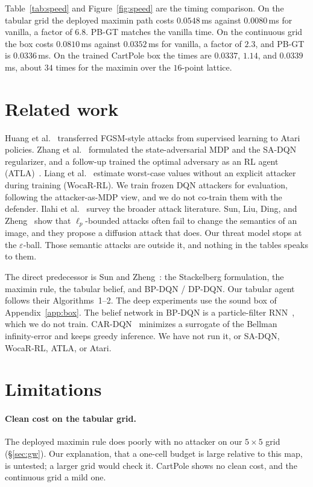 \documentclass[10pt,twocolumn]{article}
\begin{document}
Table~\ref{tab:speed} and Figure~\ref{fig:speed} are the timing comparison.
On the tabular grid the deployed maximin path costs $0.0548$\,ms against $0.0080$\,ms for vanilla, a factor of $6.8$.
PB-GT matches the vanilla time.
On the continuous grid the box costs $0.0810$\,ms against $0.0352$\,ms for vanilla, a factor of $2.3$, and PB-GT is $0.0336$\,ms.
On the trained CartPole box the times are $0.0337$, $1.14$, and $0.0339$\,ms, about $34$ times for the maximin over the $16$-point lattice.

\section{Related work}
\label{sec:related}

Huang et al.~\cite{huang2017adversarial} transferred FGSM-style attacks from supervised learning to Atari policies.
Zhang et al.~\cite{zhang2020robust} formulated the state-adversarial MDP and the SA-DQN regularizer, and a follow-up trained the optimal adversary as an RL agent (ATLA)~\cite{zhang2021robust}.
Liang et al.~\cite{liang2022wocar} estimate worst-case values without an explicit attacker during training (WocaR-RL).
We train frozen DQN attackers for evaluation, following the attacker-as-MDP view, and we do not co-train them with the defender.
Ilahi et al.~\cite{ilahi2022challenges} survey the broader attack literature.
Sun, Liu, Ding, and Zheng~\cite{sun2025shift} show that $\ell_p$-bounded attacks often fail to change the semantics of an image, and they propose a diffusion attack that does.
Our threat model stops at the $\varepsilon$-ball.
Those semantic attacks are outside it, and nothing in the tables speaks to them.

The direct predecessor is Sun and Zheng~\cite{sun2024belief}: the Stackelberg formulation, the maximin rule, the tabular belief, and BP-DQN / DP-DQN.
Our tabular agent follows their Algorithms~1--2.
The deep experiments use the sound box of Appendix~\ref{app:box}.
The belief network in BP-DQN is a particle-filter RNN~\cite{ma2020pfrnn}, which we do not train.
CAR-DQN~\cite{li2024car} minimizes a surrogate of the Bellman infinity-error and keeps greedy inference.
We have not run it, or SA-DQN, WocaR-RL, ATLA, or Atari.

\section{Limitations}
\label{sec:limit}

\paragraph{Clean cost on the tabular grid.}
The deployed maximin rule does poorly with no attacker on our $5{\times}5$ grid (\S\ref{sec:gw}).
Our explanation, that a one-cell budget is large relative to this map, is untested; a larger grid would check it.
CartPole shows no clean cost, and the continuous grid a mild one.
\end{document}
